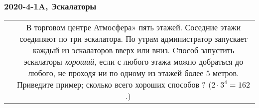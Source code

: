 \begin{frame} \frametitle{2020-4-1A, Эскалаторы}

\begin{center} \begin{tabular}{cc}
	\makecell[l]{} &
	\makecell[l]{
		В торговом центре Атмосфера» пять этажей. \\
		Соседние этажи соединяют по три эскалатора. \\
		По утрам администратор запускает каждый \\
		из эскалаторов вверх или вниз. Cпособ \\
		запустить эскалаторы {\it хороший,} если \\
		с любого этажа можно добраться до любого, \\
		не проходя ни по одному из этажей \\
		более 5 метров. Приведите пример; сколько всего \\
		хороших способов ? ($2 \cdot 3^4 = 162$.) \\ \ \\ \ \\}
\end{tabular} \end{center}

\end{frame}
